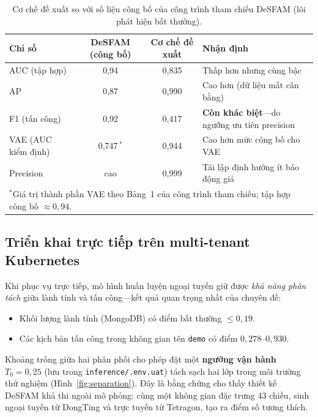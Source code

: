 \begin{table}[htbp]
  \centering
  \caption{Cơ chế đề xuất so với số liệu công bố của công trình tham chiếu DeSFAM
           (lõi phát hiện bất thường).}
  \label{tab:compare}
  \begin{tabular}{lcc>{\raggedright\arraybackslash}p{4.2cm}}
    \toprule
    \textbf{Chỉ số} & \textbf{DeSFAM (công bố)} & \textbf{Cơ chế đề xuất} & \textbf{Nhận định} \\
    \midrule
    AUC (tập hợp)        & 0{,}94 & 0{,}835 & Thấp hơn nhưng cùng bậc \\
    AP                   & 0{,}87 & 0{,}990 & Cao hơn (dữ liệu mất cân bằng) \\
    F1 (tấn công)        & 0{,}92 & 0{,}417 & \textbf{Còn khác biệt}---do ngưỡng ưu tiên precision \\
    VAE (AUC kiểm định)  & 0{,}747\,$^{*}$ & 0{,}944 & Cao hơn mức công bố cho VAE \\
    Precision            & cao    & 0{,}999 & Tái lập định hướng ít báo động giả \\
    \bottomrule
    \multicolumn{4}{l}{\footnotesize $^{*}$Giá trị thành phần VAE theo Bảng~1 của công trình tham chiếu; tập hợp công bố $\approx 0{,}94$.}
  \end{tabular}
\end{table}

\subsection{Triển khai trực tiếp trên multi-tenant Kubernetes}
Khi phục vụ trực tiếp, mô hình huấn luyện ngoại tuyến giữ được \emph{khả năng phân
tách} giữa lành tính và tấn công---kết quả quan trọng nhất của chuyên đề:
\begin{itemize}[leftmargin=1.6em]
  \item Khối lượng lành tính (MongoDB) có điểm bất thường $\le 0{,}19$.
  \item Các kịch bản tấn công trong không gian tên \texttt{demo} có điểm
        $0{,}278$--$0{,}930$.
\end{itemize}
Khoảng trống giữa hai phân phối cho phép đặt một \textbf{ngưỡng vận hành
$T_0 = 0{,}25$} (lưu trong \texttt{inference/.env.uat}) tách sạch hai lớp trong
môi trường thử nghiệm (Hình~\ref{fig:separation}). Đây là bằng chứng cho thấy
thiết kế DeSFAM khả thi ngoài mô phỏng: cùng một không gian đặc trưng 43 chiều,
sinh ngoại tuyến từ DongTing và trực tuyến từ Tetragon, tạo ra điểm số tương thích.

